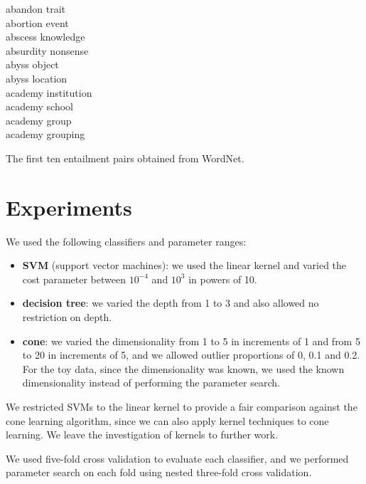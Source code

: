 \begin{table}
\begin{center}
\begin{minipage}{4cm}
abandon trait\\
abortion event\\
abscess knowledge\\
absurdity nonsense\\
abyss object\\
abyss location\\
academy institution\\
academy school\\
academy group\\
academy grouping\\
\end{minipage}
\end{center}
\caption{The first ten entailment pairs obtained from WordNet.}
\label{table:pairs}
\end{table}

\section{Experiments}

We used the following classifiers and parameter ranges:
\begin{itemize}
\item \textbf{SVM} (support vector machines): we used the linear
  kernel and varied the cost parameter between $10^{-4}$ and $10^{3}$
  in powers of 10.
\item \textbf{decision tree}: we varied the depth from 1 to 3 and also
  allowed no restriction on depth.
\item \textbf{cone}: we varied the dimensionality from 1 to 5 in
  increments of 1 and from 5 to 20 in increments of 5, and we allowed
  outlier proportions of 0, 0.1 and 0.2. For the toy data, since the
  dimensionality was known, we used the known dimensionality instead
  of performing the parameter search.
\end{itemize}
We restricted SVMs to the linear kernel to provide a fair comparison
against the cone learning algorithm, since we can also apply kernel
techniques to cone learning. We leave the investigation of kernels to
further work.

We used five-fold cross validation to evaluate each classifier, and we
performed parameter search on each fold using nested three-fold cross
validation.

